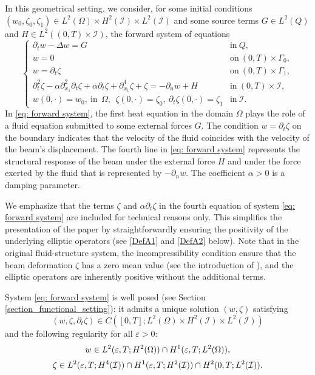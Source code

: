 \documentclass[a4paper, 12pt]{article}
\theoremstyle{plain}
\theoremstyle{definition}
\numberwithin{theorem}{section}
\numberwithin{equation}{section}
\begin{document}
In this geometrical setting, we consider, for some initial conditions $(w_0,\zeta_0,\zeta_1) \in L^2(\Omega) \times H^2(\mathcal I) \times L^2(\mathcal I)$ and some source terms $G \in L^2(Q)$ and $H \in L^2((0,T) \times \mathcal I)$, the forward system of equations
\begin{equation} \label{eq: forward system}
 \begin{cases}
\partial_t w -\Delta w = G& \text{in}~Q,\\
w=0 &\text{on}~(0,T) \times\Gamma_0,\\
w=\partial_t\zeta  &\text{on}~(0,T) \times\Gamma_1,\\
\partial^2_{t}\zeta-\alpha\partial^2_{x_1}\partial_t\zeta+\alpha\partial_t\zeta+\partial^4_{x_1}\zeta+\zeta=-\partial_nw+H  & \text{in}~(0,T) \times\mathcal{I},\\
w(0,\cdot)=w_0,~\text{in}~~\Omega,~~ \zeta(0,\cdot)=\zeta_0,~ \partial_t\zeta(0,\cdot)=\zeta_1 &\text{in}~\mathcal{I}.
\end{cases}  
\end{equation}
In \eqref{eq: forward system}, the first heat equation in the domain $\Omega$ plays the role of a fluid equation submitted to some external forces $G$. The condition $w=\partial_t\zeta$ on the boundary indicates that the velocity of the fluid coincides with the velocity of the beam's displacement. The fourth line in \eqref{eq: forward system} represents the structural response of the beam under the external force $H$ and under the force exerted by the fluid that is represented by $-\partial_n w$. The coefficient $\alpha>0$ is a damping parameter. 
 
 
 We emphasize that the terms $\zeta$ and $\alpha \partial_t \zeta$ in the fourth equation of system \eqref{eq: forward system} are included for technical reasons only. This simplifies the presentation of the  paper  by straightforwardly ensuring the positivity of the underlying elliptic operators (see \eqref{DefA1} and \eqref{DefA2} below). Note that in the original fluid-structure system, the incompressibility condition ensure that the beam deformation $\zeta$ has a zero mean value (see the introduction of \cite{BeiroVeiga2004}), and the elliptic operators are inherently positive without the additional terms.


System \eqref{eq: forward system} is well posed (see Section \ref{section_functional_setting}): it admits a unique solution $(w,\zeta)$ satisfying 
\begin{equation}\label{RegClassic1}
    (w,\zeta,\partial_t\zeta)\in C([0,T];L^2(\Omega) \times H^2(\mathcal I)\times L^2(\mathcal I))
\end{equation}
and the following regularity for all $ \varepsilon>0$:
\begin{equation}\label{RegClassic2}
\begin{array}{c}
\displaystyle w \in L^2(\varepsilon,T; H^2(\Omega)) \cap H^1(\varepsilon,T;L^{2}(\Omega)),\medskip \\
\displaystyle \zeta \in L^2(\varepsilon,T;H^4(\mathcal I)) \cap
H^1(\varepsilon,T;H^2(\mathcal I))\cap H^2(0,T;L^2(\mathcal I)).
\end{array}
\end{equation}
\end{document}
